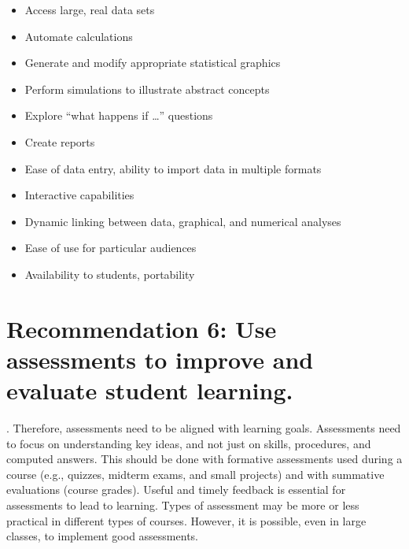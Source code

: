 \documentclass[twoside,openany]{tufte-book}
\begin{document}
 \vspace{.2in}
\noindent{}
\renewcommand\labelitemi{$\checkmark$}

\begin{itemize}[leftmargin=1cm, itemsep=.2em]
\item Access large, real data sets
\item Automate calculations
\item Generate and modify appropriate statistical graphics
\item Perform simulations to illustrate abstract concepts
\item Explore ``what happens if \ldots'' questions
\item Create reports
\end{itemize}

\vspace{.2in}
 
\noindent{}

\renewcommand\labelitemi{$\filledsquare$}

\begin{itemize}[leftmargin=1cm, itemsep=.2em]
\item Ease of data entry, ability to import data in multiple formats
\item Interactive capabilities
\item Dynamic linking between data, graphical, and numerical analyses 
\item Ease of use for particular audiences
\item Availability to students, portability\\
\end{itemize}


\section{\textbf{Recommendation 6: Use assessments to improve and evaluate student learning.}}

. Therefore, assessments need to be aligned with learning goals. Assessments need to focus on understanding key ideas, and not just on skills, procedures, and computed answers. This should be done with formative assessments used during a course (e.g., quizzes, midterm exams, and small projects) and with summative evaluations (course grades). Useful and timely feedback is essential for assessments to lead to learning.  Types of assessment may be more or less practical in different types of courses. However, it is possible, even in large classes, to implement good assessments. \\
\end{document}
